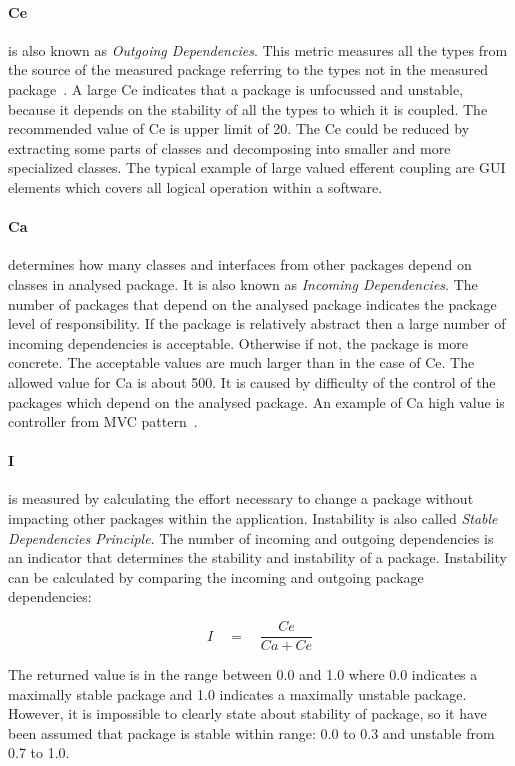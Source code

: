 \paragraph{\ac{Ce}} is also known as \textit{Outgoing Dependencies}. This metric measures all the types from the source of the measured package referring to the types not in the measured package~\cite{martin}. A large \ac{Ce} indicates that a package is unfocussed and unstable, because it depends on the stability of all the types to which it is coupled. The recommended value of \ac{Ce} is upper limit of 20. The \ac{Ce} could be reduced by extracting some parts of classes and decomposing into smaller and more specialized classes. The typical example of large valued efferent coupling are GUI elements which covers all logical operation within a software.

\paragraph{\ac{Ca}} determines how many classes and interfaces from other packages depend on classes in analysed package. It is also known as \textit{Incoming Dependencies}. The number of packages that depend on the analysed package indicates the package level of responsibility. If the package is relatively abstract then a large number of incoming dependencies is acceptable. Otherwise if not, the package is more concrete. The acceptable values are much larger than in the case of \ac{Ce}. The allowed value for \ac{Ca} is about 500. It is caused by difficulty of the control of the packages which depend on the analysed package. An example of \ac{Ca} high value is controller from MVC pattern~\cite{martin}.

\paragraph{\ac{I}} is measured by calculating the effort necessary  to change a package without impacting other packages within the application. Instability is also called \textit{Stable Dependencies Principle}. The number of incoming and outgoing dependencies is an indicator that determines the stability and instability of a package. Instability can be calculated by comparing the incoming and outgoing package dependencies:

\begin{equation}
I\quad =\quad \frac { Ce }{ Ca+Ce } 
\end{equation}

The returned value is in the range between 0.0 and 1.0 where 0.0 indicates a maximally stable package and 1.0 indicates a maximally unstable package. However, it is impossible to clearly state about stability of package, so it have been assumed that package is stable within range: 0.0 to 0.3 and unstable from 0.7 to 1.0.

